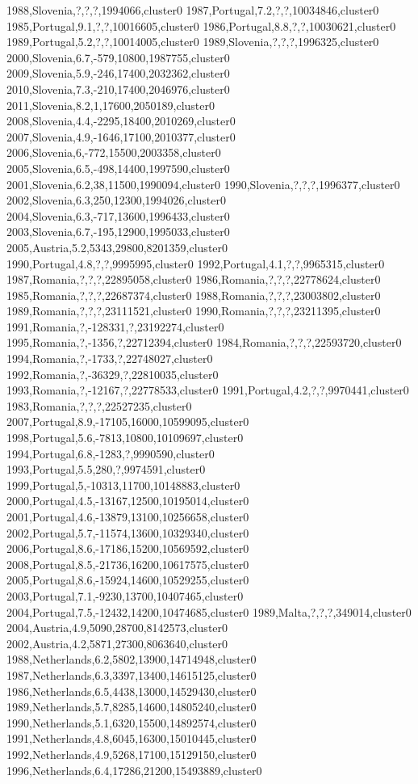 1988,Slovenia,?,?,?,1994066,cluster0
1987,Portugal,7.2,?,?,10034846,cluster0
1985,Portugal,9.1,?,?,10016605,cluster0
1986,Portugal,8.8,?,?,10030621,cluster0
1989,Portugal,5.2,?,?,10014005,cluster0
1989,Slovenia,?,?,?,1996325,cluster0
2000,Slovenia,6.7,-579,10800,1987755,cluster0
2009,Slovenia,5.9,-246,17400,2032362,cluster0
2010,Slovenia,7.3,-210,17400,2046976,cluster0
2011,Slovenia,8.2,1,17600,2050189,cluster0
2008,Slovenia,4.4,-2295,18400,2010269,cluster0
2007,Slovenia,4.9,-1646,17100,2010377,cluster0
2006,Slovenia,6,-772,15500,2003358,cluster0
2005,Slovenia,6.5,-498,14400,1997590,cluster0
2001,Slovenia,6.2,38,11500,1990094,cluster0
1990,Slovenia,?,?,?,1996377,cluster0
2002,Slovenia,6.3,250,12300,1994026,cluster0
2004,Slovenia,6.3,-717,13600,1996433,cluster0
2003,Slovenia,6.7,-195,12900,1995033,cluster0
2005,Austria,5.2,5343,29800,8201359,cluster0
1990,Portugal,4.8,?,?,9995995,cluster0
1992,Portugal,4.1,?,?,9965315,cluster0
1987,Romania,?,?,?,22895058,cluster0
1986,Romania,?,?,?,22778624,cluster0
1985,Romania,?,?,?,22687374,cluster0
1988,Romania,?,?,?,23003802,cluster0
1989,Romania,?,?,?,23111521,cluster0
1990,Romania,?,?,?,23211395,cluster0
1991,Romania,?,-128331,?,23192274,cluster0
1995,Romania,?,-1356,?,22712394,cluster0
1984,Romania,?,?,?,22593720,cluster0
1994,Romania,?,-1733,?,22748027,cluster0
1992,Romania,?,-36329,?,22810035,cluster0
1993,Romania,?,-12167,?,22778533,cluster0
1991,Portugal,4.2,?,?,9970441,cluster0
1983,Romania,?,?,?,22527235,cluster0
2007,Portugal,8.9,-17105,16000,10599095,cluster0
1998,Portugal,5.6,-7813,10800,10109697,cluster0
1994,Portugal,6.8,-1283,?,9990590,cluster0
1993,Portugal,5.5,280,?,9974591,cluster0
1999,Portugal,5,-10313,11700,10148883,cluster0
2000,Portugal,4.5,-13167,12500,10195014,cluster0
2001,Portugal,4.6,-13879,13100,10256658,cluster0
2002,Portugal,5.7,-11574,13600,10329340,cluster0
2006,Portugal,8.6,-17186,15200,10569592,cluster0
2008,Portugal,8.5,-21736,16200,10617575,cluster0
2005,Portugal,8.6,-15924,14600,10529255,cluster0
2003,Portugal,7.1,-9230,13700,10407465,cluster0
2004,Portugal,7.5,-12432,14200,10474685,cluster0
1989,Malta,?,?,?,349014,cluster0
2004,Austria,4.9,5090,28700,8142573,cluster0
2002,Austria,4.2,5871,27300,8063640,cluster0
1988,Netherlands,6.2,5802,13900,14714948,cluster0
1987,Netherlands,6.3,3397,13400,14615125,cluster0
1986,Netherlands,6.5,4438,13000,14529430,cluster0
1989,Netherlands,5.7,8285,14600,14805240,cluster0
1990,Netherlands,5.1,6320,15500,14892574,cluster0
1991,Netherlands,4.8,6045,16300,15010445,cluster0
1992,Netherlands,4.9,5268,17100,15129150,cluster0
1996,Netherlands,6.4,17286,21200,15493889,cluster0
